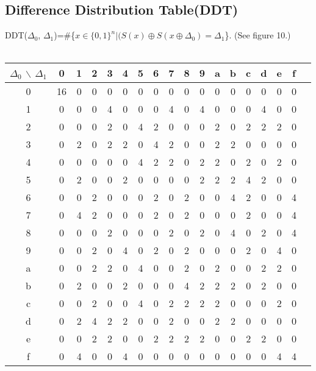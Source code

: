 \documentclass{article}
\begin{document}
\subsection{Difference Distribution Table(DDT)}
DDT($\Delta_0$, $\Delta_1$)=\#\{$x \in \{0,1\}^n|(S(x)\oplus S(x\oplus\Delta_0) = \Delta_1$\}. (See figure 10.)\\\\
\begin{tabular}{c||c c c c c c c c c c c c c c c c c|}
	$\Delta_0$ $\backslash$ $\Delta_1$ &0 &1 & 2 & 3 &4&5&6&7&8&9&a&b&c&d&e&f\\
	\hline\hline
	0&16 &0 &0 &0 &0 &0 &0 &0 &0 &0 &0 &0 &0 &0 &0 &0 \\
	1&0 &0& 0& 4 &0 &0 &0& 4& 0& 4 &0 &0 &0 &4 &0 &0 \\
	2&0& 0& 0 &2& 0& 4& 2& 0 &0 &0 &2 &0 &2 &2 &2 &0 \\
	3&0& 2& 0 &2 &2 &0 &4 &2 &0 &0 &2 &2 &0 &0 &0 &0 \\
	4&0 &0& 0 &0 &0 &4 &2 &2 &0 &2 &2 &0 &2 &0 &2 &0 \\
	5&0 &2& 0 &0& 2& 0& 0& 0 &0& 2& 2& 2& 4& 2& 0& 0 \\
	6&0& 0& 2 &0 &0 &0 &2 &0 &2 &0 &0 &4 &2 &0 &0 &4 \\
	7&0& 4 &2 &0 &0 &0 &2 &0 &2 &0 &0 &0 &2 &0 &0 &4 \\
	8&0& 0 &0 &2 &0 &0 &0 &2 &0 &2 &0 &4 &0 &2 &0 &4 \\
	9&0& 0 &2 &0 &4 &0 &2 &0 &2 &0 &0 &0 &2 &0 &4 &0 \\
	a&0& 0 &2 &2 &0 &4 &0 &0 &2 &0 &2 &0 &0 &2 &2 &0 \\
	b&0& 2 &0 &0 &2 &0 &0 &0 &4 &2 &2 &2 &0 &2 &0 &0 \\
	c&0& 0 &2 &0 &0 &4 &0 &2 &2 &2 &2& 0& 0& 0& 2& 0 \\
	d&0& 2 &4 &2 &2 &0 &0 &2 &0& 0& 2&2& 0& 0& 0& 0 \\
	e&0& 0 &2 &2 &0 &0 &2 &2 &2 &2 &0 &0 &2 &2 &0 &0 \\
	f&0& 4 &0 &0 &4 &0 &0 &0 &0 &0 &0 &0 &0 &0 &4 &4 \\
\end{tabular}\\\\\\
\end{document}
